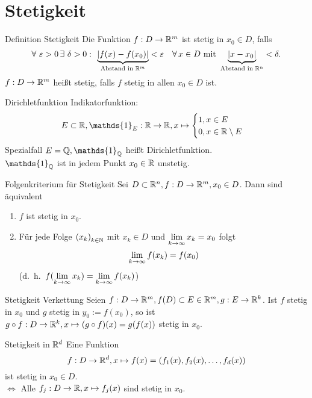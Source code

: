 \documentclass[main.tex]{subfiles}
\begin{document}
\section*{Stetigkeit}
\begin{karte}{Definition Stetigkeit}
    Die Funktion \( f: D\rightarrow \mathbb{R}^m \) ist stetig 
    in \( x_0 \in D \), falls
    \[ \forall \, \varepsilon > 0 \,\exists \, \delta > 0 
    \, \colon \, \underbrace{ \abs{ f(x) - f(x_0) 
    }}_{\text{Abstand in } \R^m} < \varepsilon \quad 
    \forall x\in D \text{ mit } \underbrace{\abs{x - x_0} 
    }_{\text{Abstand in } \R^n} < \delta. \]
    \( f: D\rightarrow \mathbb{R}^m \) heißt stetig, falls \( f \) 
    stetig in allen \(x_0 \in D \) ist.
\end{karte}
\begin{karte}{Dirichletfunktion}
    Indikatorfunktion:
    \[ E\subset \R, 
        \mathds{1}_E : \R\rightarrow\R, x\mapsto 
        \begin{cases}
        1, x\in E\\
        0, x\in\R \setminus E
    \end{cases} \]
    Spezialfall \( E = \Q, \mathds{1}_\Q \) heißt Dirichletfunktion.\\
    \( \mathds{1}_\Q \) ist in jedem Punkt \( x_0 \in \mathbb{R} \) unstetig.
\end{karte}
\begin{karte}{Folgenkriterium für Stetigkeit}
    Sei \( D\subset \mathbb{R}^n, f:D\rightarrow \mathbb{R}^m, x_0 \in D \). Dann sind
    äquivalent
    \begin{enumerate}
        \item \( f \) ist stetig in \( x_0 \).
        \item Für jede Folge \( {(x_k)}_{k\in\mathbb{N}} \) mit \( x_k \in D \)
        und \( \lim\limits_{k\rightarrow\infty} x_k = x_0 \) folgt 
        \[ \lim\limits_{k\rightarrow\infty} f(x_k) = f(x_0) \]
        (d.\ h.\  \( f(\lim\limits_{k\rightarrow\infty} x_k) = \lim\limits_{k\rightarrow\infty} f(x_k) \))
    \end{enumerate}
\end{karte}
\begin{karte}{Stetigkeit Verkettung}
    Seien \( f:D\rightarrow \mathbb{R}^m, f(D) \subset E \in\mathbb{R}^m, 
    g: E\rightarrow\mathbb{R}^k \). Ist \( f \) stetig in \( x_0 \)
    und \( g \) stetig in \( y_0 := f(x_0) \), so ist 
    \( g \circ f : D\rightarrow \mathbb{R}^k, x \mapsto (g\circ f)(x) 
    = g(f(x)) \) stetig in \( x_0 \).
\end{karte}
\begin{karte}{Stetigkeit in \( \mathbb{R}^d \)}
    Eine Funktion \[ f: D\rightarrow \mathbb{R}^d, x\mapsto 
    f(x) = (f_1(x), f_2(x), \dots , f_d(x)) \]
    ist stetig in  \(x_0 \in D\).\\
    \( \Leftrightarrow \) Alle  
    \( f_j : D \rightarrow \mathbb{R}, x\mapsto f_j(x) \) 
    sind stetig in \( x_0 \).
\end{karte}
\end{document}
